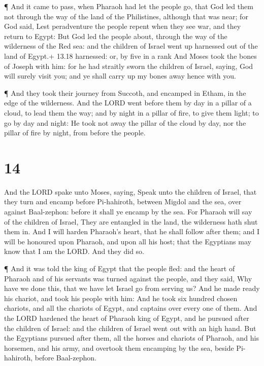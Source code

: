  ¶ And it came to pass, when Pharaoh had let the people go,
that God led them not through the way of the land of the Philistines,
although that was near; for God said, Lest peradventure the people
repent when they see war, and they return to Egypt:  But
God led the people about, through the way of the wilderness of the Red
sea: and the children of Israel went up harnessed out of the land of
Egypt.+ 13.18 harnessed: or, by five in a rank  And Moses
took the bones of Joseph with him: for he had straitly sworn the
children of Israel, saying, God will surely visit you; and ye shall
carry up my bones away hence with you.

 ¶ And they took their journey from Succoth, and encamped
in Etham, in the edge of the wilderness.  And the LORD went
before them by day in a pillar of a cloud, to lead them the way; and by
night in a pillar of fire, to give them light; to go by day and night:
 He took not away the pillar of the cloud by day, nor the
pillar of fire by night, from before the people.

\hypertarget{section-13}{%
\section{14}\label{section-13}}

 And the LORD spake unto Moses, saying,  Speak
unto the children of Israel, that they turn and encamp before
Pi-hahiroth, between Migdol and the sea, over against Baal-zephon:
before it shall ye encamp by the sea.  For Pharaoh will say
of the children of Israel, They are entangled in the land, the
wilderness hath shut them in.  And I will harden Pharaoh's
heart, that he shall follow after them; and I will be honoured upon
Pharaoh, and upon all his host; that the Egyptians may know that I am
the LORD. And they did so.

 ¶ And it was told the king of Egypt that the people fled:
and the heart of Pharaoh and of his servants was turned against the
people, and they said, Why have we done this, that we have let Israel go
from serving us?  And he made ready his chariot, and took
his people with him:  And he took six hundred chosen
chariots, and all the chariots of Egypt, and captains over every one of
them.  And the LORD hardened the heart of Pharaoh king of
Egypt, and he pursued after the children of Israel: and the children of
Israel went out with an high hand.  But the Egyptians
pursued after them, all the horses and chariots of Pharaoh, and his
horsemen, and his army, and overtook them encamping by the sea, beside
Pi-hahiroth, before Baal-zephon.

